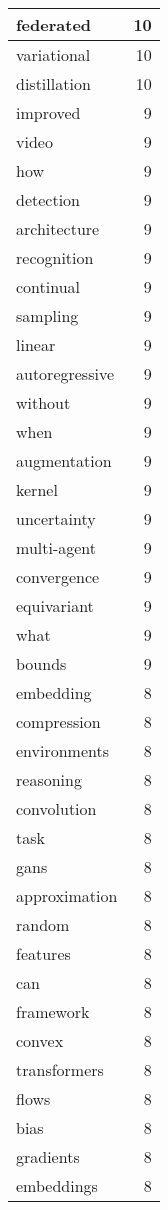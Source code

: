 \begin{table}[h]
\begin{tabular}{|l|r|}
\hline
federated & 10 \\
\hline
variational & 10 \\
\hline
distillation & 10 \\
\hline
improved & 9 \\
\hline
video & 9 \\
\hline
how & 9 \\
\hline
detection & 9 \\
\hline
architecture & 9 \\
\hline
recognition & 9 \\
\hline
continual & 9 \\
\hline
sampling & 9 \\
\hline
linear & 9 \\
\hline
autoregressive & 9 \\
\hline
without & 9 \\
\hline
when & 9 \\
\hline
augmentation & 9 \\
\hline
kernel & 9 \\
\hline
uncertainty & 9 \\
\hline
multi-agent & 9 \\
\hline
convergence & 9 \\
\hline
equivariant & 9 \\
\hline
what & 9 \\
\hline
bounds & 9 \\
\hline
embedding & 8 \\
\hline
compression & 8 \\
\hline
environments & 8 \\
\hline
reasoning & 8 \\
\hline
convolution & 8 \\
\hline
task & 8 \\
\hline
gans & 8 \\
\hline
approximation & 8 \\
\hline
random & 8 \\
\hline
features & 8 \\
\hline
can & 8 \\
\hline
framework & 8 \\
\hline
convex & 8 \\
\hline
transformers & 8 \\
\hline
flows & 8 \\
\hline
bias & 8 \\
\hline
gradients & 8 \\
\hline
embeddings & 8 \\

\end{tabular}
\end{table}
